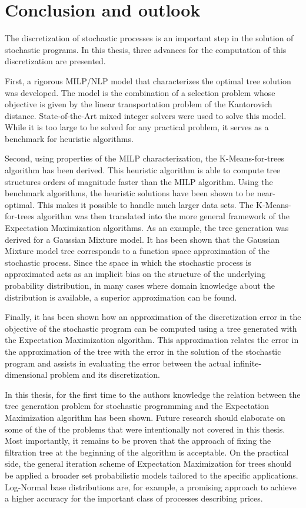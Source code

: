 \section{Conclusion and outlook}
The discretization of stochastic processes is an important step in the solution of stochastic programs. In this thesis, three advances for the computation of this discretization are presented.

First, a rigorous MILP/NLP model that characterizes the optimal tree solution was developed. The model is the combination of a selection problem whose objective is given by the linear transportation problem of the Kantorovich distance. State-of-the-Art mixed integer solvers were used to solve this model. While it is too large to be solved for any practical problem, it serves as a benchmark for heuristic algorithms.

Second, using properties of the MILP characterization, the K-Means-for-trees algorithm has been derived. This heuristic algorithm is able to compute tree structures orders of magnitude faster than the MILP algorithm. Using the benchmark algorithms, the heuristic solutions have been shown to be near-optimal. This makes it possible to handle much larger data sets. The K-Means-for-trees algorithm was then translated into the more general framework of the Expectation Maximization algorithms. As an example, the tree generation was derived for a Gaussian Mixture model. It has been shown that the Gaussian Mixture model tree corresponds to a function space approximation of the stochastic process. Since the space in which the stochastic process is approximated acts as an implicit bias on the structure of the underlying probability distribution, in many cases where domain knowledge about the distribution is available, a superior approximation can be found.

Finally, it has been shown how an approximation of the discretization error in the objective of the stochastic program can be computed using a tree generated with the Expectation Maximization algorithm. This approximation relates the error in the approximation of the tree with the error in the solution of the stochastic program and assists in evaluating the error between the actual infinite-dimensional problem and its discretization.

In this thesis, for the first time to the authors knowledge the relation between the tree generation problem for stochastic programming and the Expectation Maximization algorithm has been shown. Future research should elaborate on some of the of the problems that were intentionally not covered in this thesis. Most importantly, it remains to be proven that the approach of fixing the filtration tree at the beginning of the algorithm is acceptable. On the practical side, the general iteration scheme of Expectation Maximization for trees should be applied a broader set probabilistic models tailored to the specific applications. Log-Normal base distributions are, for example, a promising approach to achieve a higher accuracy for the important class of processes describing prices.
